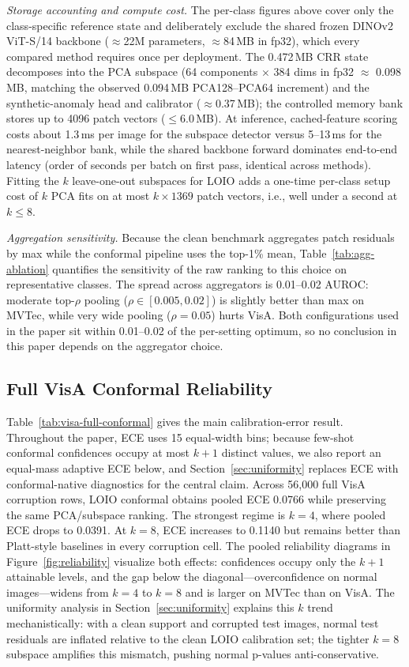 \emph{Storage accounting and compute cost.} The per-class figures above cover only the class-specific reference state and deliberately exclude the shared frozen DINOv2 ViT-S/14 backbone ($\approx$22M parameters, $\approx$84\,MB in fp32), which every compared method requires once per deployment. The 0.472\,MB CRR state decomposes into the PCA subspace (64 components $\times$ 384 dims in fp32 $\approx$ 0.098\,MB, matching the observed 0.094\,MB PCA128--PCA64 increment) and the synthetic-anomaly head and calibrator ($\approx$0.37\,MB); the controlled memory bank stores up to 4096 patch vectors ($\le$6.0\,MB). At inference, cached-feature scoring costs about 1.3\,ms per image for the subspace detector versus 5--13\,ms for the nearest-neighbor bank, while the shared backbone forward dominates end-to-end latency (order of seconds per batch on first pass, identical across methods). Fitting the $k$ leave-one-out subspaces for LOIO adds a one-time per-class setup cost of $k$ PCA fits on at most $k{\times}1369$ patch vectors, i.e., well under a second at $k\le8$.


\emph{Aggregation sensitivity.} Because the clean benchmark aggregates patch residuals by max while the conformal pipeline uses the top-1\% mean, Table~\ref{tab:agg-ablation} quantifies the sensitivity of the raw ranking to this choice on representative classes. The spread across aggregators is 0.01--0.02 AUROC: moderate top-$\rho$ pooling ($\rho\in[0.005,0.02]$) is slightly better than max on MVTec, while very wide pooling ($\rho{=}0.05$) hurts VisA. Both configurations used in the paper sit within 0.01--0.02 of the per-setting optimum, so no conclusion in this paper depends on the aggregator choice.

\subsection{Full VisA Conformal Reliability}

Table~\ref{tab:visa-full-conformal} gives the main calibration-error result. Throughout the paper, ECE uses 15 equal-width bins; because few-shot conformal confidences occupy at most $k{+}1$ distinct values, we also report an equal-mass adaptive ECE below, and Section~\ref{sec:uniformity} replaces ECE with conformal-native diagnostics for the central claim. Across 56,000 full VisA corruption rows, LOIO conformal obtains pooled ECE 0.0766 while preserving the same PCA/subspace ranking. The strongest regime is $k=4$, where pooled ECE drops to 0.0391. At $k=8$, ECE increases to 0.1140 but remains better than Platt-style baselines in every corruption cell. The pooled reliability diagrams in Figure~\ref{fig:reliability} visualize both effects: confidences occupy only the $k{+}1$ attainable levels, and the gap below the diagonal---overconfidence on normal images---widens from $k{=}4$ to $k{=}8$ and is larger on MVTec than on VisA. The uniformity analysis in Section~\ref{sec:uniformity} explains this $k$ trend mechanistically: with a clean support and corrupted test images, normal test residuals are inflated relative to the clean LOIO calibration set; the tighter $k{=}8$ subspace amplifies this mismatch, pushing normal p-values anti-conservative.

